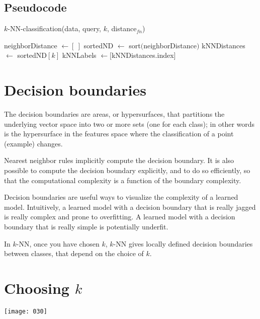 \subsection{Pseudocode}
\begin{algorithm}
\caption{$k$-NN-classification(data, query, $k$, distance$_{fn}$)}
\label{alg:k-nn}
neighborDistance $\gets [\ ]$\;
sortedND $\gets$ sort$($neighborDistance$)$\;
kNNDistances $\gets$ sortedND$[k]$
kNNLabels $\gets [$kNNDistances.index$]$
\end{algorithm}


\section{Decision boundaries}
The decision boundaries are areas, or hypersurfaces, that partitions the underlying vector space into two or more sets (one for each class); in other words is the hypersurface in the features space where the classification of a point (example) changes.

Nearest neighbor rules implicitly compute the decision boundary. It is also possible to compute the decision boundary explicitly, and to do so efficiently, so that the computational complexity is a function of the boundary complexity.

Decision boundaries are useful ways to visualize the complexity of a learned model. Intuitively, a learned model with a decision boundary that is really jagged is really complex and prone to overfitting. A learned model with a decision boundary that is really simple is potentially underfit.

In \(k\)-NN, once you have chosen \(k\), \(k\)-NN gives locally defined decision boundaries between classes, that depend on the choice of \(k\).

\section{Choosing \(k\)}

\begin{center}
    \texttt{[image: 030]}
    \label{fig:030}
\end{center}

